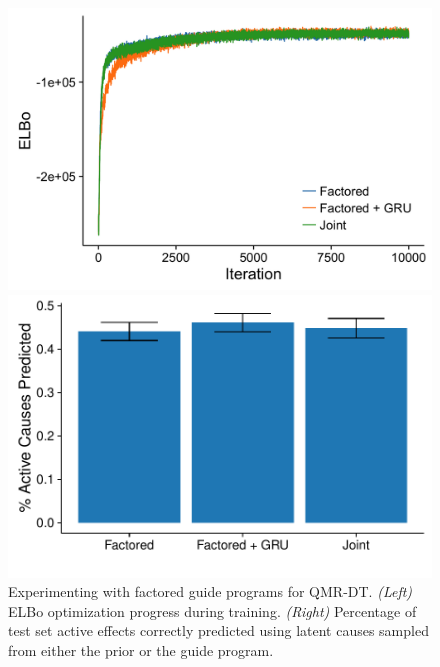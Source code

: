 \begin{figure}[!ht]
\begin{minipage}{0.5\linewidth}
\centering
\includegraphics[width=\linewidth]{figs/results/qmr/elboProgress_factored.png}
\end{minipage}
%
\begin{minipage}{0.5\linewidth}
\centering
\includegraphics[width=\linewidth]{figs/results/qmr/reconstructScores_factored.pdf}
\end{minipage}
\caption{Experimenting with factored guide programs for QMR-DT. \emph{(Left)} ELBo optimization progress during training. \emph{(Right)} Percentage of test set active effects correctly predicted using latent causes sampled from either the prior or the guide program.}
\label{fig:qmrResults_factored}
\end{figure}


%

